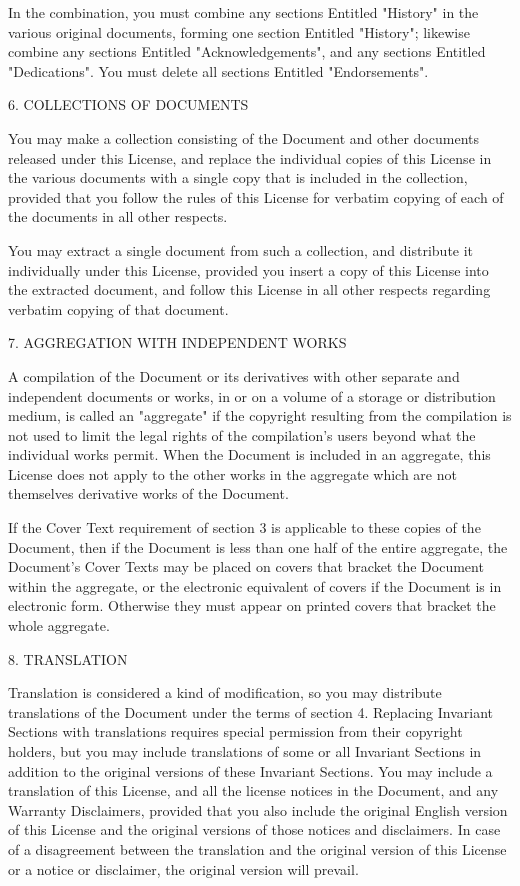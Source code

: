 \documentclass[11pt,a4paper]{article}
\begin{document}
\begin{scriptsize}
In the combination, you must combine any sections Entitled "History"
in the various original documents, forming one section Entitled
"History"; likewise combine any sections Entitled "Acknowledgements",
and any sections Entitled "Dedications".  You must delete all sections
Entitled "Endorsements".


6. COLLECTIONS OF DOCUMENTS

You may make a collection consisting of the Document and other
documents released under this License, and replace the individual
copies of this License in the various documents with a single copy
that is included in the collection, provided that you follow the rules
of this License for verbatim copying of each of the documents in all
other respects.

You may extract a single document from such a collection, and
distribute it individually under this License, provided you insert a
copy of this License into the extracted document, and follow this
License in all other respects regarding verbatim copying of that
document.


7. AGGREGATION WITH INDEPENDENT WORKS

A compilation of the Document or its derivatives with other separate
and independent documents or works, in or on a volume of a storage or
distribution medium, is called an "aggregate" if the copyright
resulting from the compilation is not used to limit the legal rights
of the compilation's users beyond what the individual works permit.
When the Document is included in an aggregate, this License does not
apply to the other works in the aggregate which are not themselves
derivative works of the Document.

If the Cover Text requirement of section 3 is applicable to these
copies of the Document, then if the Document is less than one half of
the entire aggregate, the Document's Cover Texts may be placed on
covers that bracket the Document within the aggregate, or the
electronic equivalent of covers if the Document is in electronic form.
Otherwise they must appear on printed covers that bracket the whole
aggregate.


8. TRANSLATION

Translation is considered a kind of modification, so you may
distribute translations of the Document under the terms of section 4.
Replacing Invariant Sections with translations requires special
permission from their copyright holders, but you may include
translations of some or all Invariant Sections in addition to the
original versions of these Invariant Sections.  You may include a
translation of this License, and all the license notices in the
Document, and any Warranty Disclaimers, provided that you also include
the original English version of this License and the original versions
of those notices and disclaimers.  In case of a disagreement between
the translation and the original version of this License or a notice
or disclaimer, the original version will prevail.


\end{scriptsize}
\end{document}
